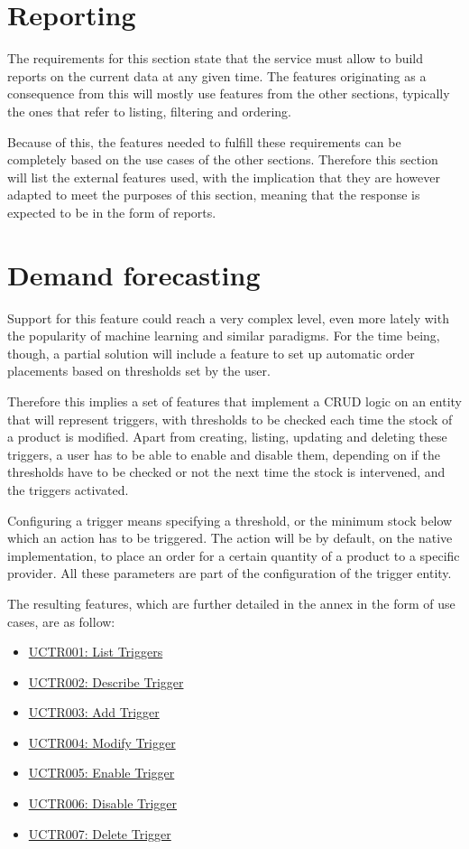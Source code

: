 \section{Reporting}
The requirements for this section state that the service must allow to build reports on the current data at any given time. The features originating as a consequence from this will mostly use features from the other sections, typically the ones that refer to listing, filtering and ordering.

Because of this, the features needed to fulfill these requirements can be completely based on the use cases of the other sections. Therefore this section will list the external features used, with the implication that they are however adapted to meet the purposes of this section, meaning that the response is expected to be in the form of reports.

\section{Demand forecasting}
Support for this feature could reach a very complex level, even more lately with the popularity of machine learning and similar paradigms. For the time being, though, a partial solution will include a feature to set up automatic order placements based on thresholds set by the user.

Therefore this implies a set of features that implement a CRUD logic on an entity that will represent triggers, with thresholds to be checked each time the stock of a product is modified. Apart from creating, listing, updating and deleting these triggers, a user has to be able to enable and disable them, depending on if the thresholds have to be checked or not the next time the stock is intervened, and the triggers activated.

Configuring a trigger means specifying a threshold, or the minimum stock below which an action has to be triggered. The action will be by default, on the native implementation, to place an order for a certain quantity of a product to a specific provider. All these parameters are part of the configuration of the trigger entity.

The resulting features, which are further detailed in the annex in the form of use cases, are as follow:
\hfill\break
\begin{itemize}
\item \hyperref[UCTR001]{UCTR001: List Triggers}
\item \hyperref[UCTR002]{UCTR002: Describe Trigger}
\item \hyperref[UCTR003]{UCTR003: Add Trigger}
\item \hyperref[UCTR004]{UCTR004: Modify Trigger}
\item \hyperref[UCTR005]{UCTR005: Enable Trigger}
\item \hyperref[UCTR006]{UCTR006: Disable Trigger}
\item \hyperref[UCTR007]{UCTR007: Delete Trigger}
\end{itemize}
\hfill\break
